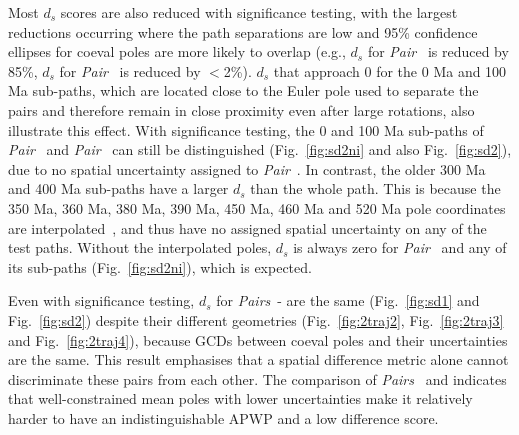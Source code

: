 Most $d_s$ scores are also reduced with significance testing, with the largest
reductions occurring where the path separations are low and 95\% confidence
ellipses for coeval poles are more likely to overlap (e.g., $d_s$ for
\emph{Pair}~\textbf{} is reduced by 85\%, $d_s$ for
\emph{Pair}~\textbf{} is reduced by $<$2\%). $d_s$ that
approach 0 for the 0 Ma and 100 Ma sub-paths, which
are located close to the Euler pole used to separate the pairs and therefore
remain in close proximity even after large rotations, also illustrate this
effect. With significance testing, the 0 and 100 Ma
sub-paths of \emph{Pair}~\textbf{} and
\emph{Pair}~\textbf{} can still be distinguished
(Fig.~\ref{fig:sd2ni} and also Fig.~\ref{fig:sd2}), due to no spatial
uncertainty assigned to \emph{Pair}~\textbf{}. In contrast,
the older 300 Ma and 400 Ma sub-paths have a larger
$d_s$ than the whole path. This is because the 350 Ma, 360 Ma, 380 Ma, 390 Ma,
450 Ma, 460 Ma and 520 Ma pole coordinates are interpolated~\citep{T12}, and
thus have no assigned spatial uncertainty on any of the test paths. Without the
interpolated poles, $d_s$ is always zero for
\emph{Pair}~\textbf{} and any of its sub-paths
(Fig.~\ref{fig:sd2ni}), which is expected.

Even with significance testing, $d_s$ for
\emph{Pairs}~\textbf{}-\textbf{} are the
same (Fig.~\ref{fig:sd1} and Fig.~\ref{fig:sd2}) despite their different
geometries (Fig.~\ref{fig:2traj2}, Fig.~\ref{fig:2traj3} and
Fig.~\ref{fig:2traj4}), because GCDs between coeval poles and their
uncertainties are the same. This result emphasises that a spatial difference
metric alone cannot discriminate these pairs from each other. The comparison of
\emph{Pairs}~\textbf{} and \textbf{}
indicates that well-constrained mean poles with lower uncertainties make it
relatively harder to have an indistinguishable APWP and a low difference score.

